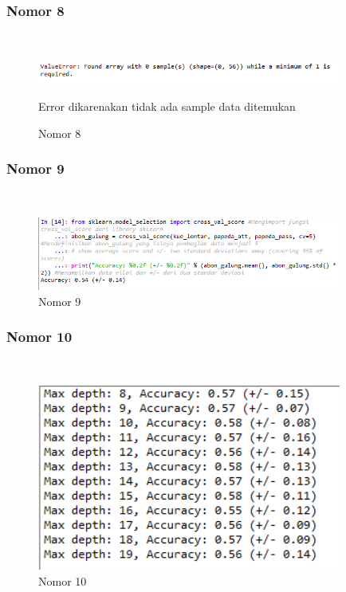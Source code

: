 \subsubsection{Nomor 8}
\hfill\\

\begin{figure}[H]
\centerline{\includegraphics[width=10cm]{figures/1174077/2/p8.png}}
\caption{Nomor 8}
Error dikarenakan tidak ada sample data ditemukan
\label{labelgambar}
\end{figure}

\subsubsection{Nomor 9}
\hfill\\

\begin{figure}[H]
\centerline{\includegraphics[width=10cm]{figures/1174077/2/p9.png}}
\caption{Nomor 9}
\label{labelgambar}
\end{figure}

\subsubsection{Nomor 10}
\hfill\\

\begin{figure}[H]
\centerline{\includegraphics[width=10cm]{figures/1174077/2/p10.png}}
\caption{Nomor 10}
\label{labelgambar}
\end{figure}

